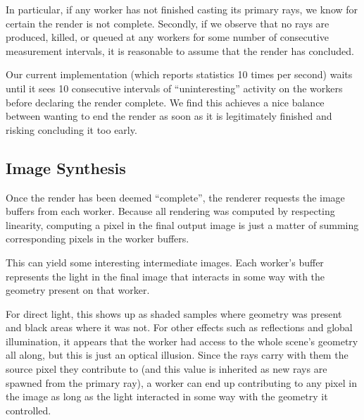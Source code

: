 \documentclass[12pt]{ucthesis}
\begin{document}
In particular, if any worker has not finished casting its primary rays, we
know for certain the render is not complete. Secondly, if we observe that no
rays are produced, killed, or queued at any workers for some number of
consecutive measurement intervals, it is reasonable to assume that the render
has concluded.

Our current implementation (which reports statistics 10 times per second)
waits until it sees 10 consecutive intervals of ``uninteresting'' activity on
the workers before declaring the render complete. We find this achieves a nice
balance between wanting to end the render as soon as it is legitimately
finished and risking concluding it too early.

\subsection{Image Synthesis}
\label{synthesis}

Once the render has been deemed ``complete'', the renderer requests the image
buffers from each worker. Because all rendering was computed by respecting
linearity, computing a pixel in the final output image is just a matter
of summing corresponding pixels in the worker buffers.

This can yield some interesting intermediate images. Each worker's buffer
represents the light in the final image that interacts in some way with the
geometry present on that worker.

For direct light, this shows up as shaded samples where geometry was present
and black areas where it was not. For other effects such as reflections and
global illumination, it appears that the worker had access to the whole scene's
geometry all along, but this is just an optical illusion. Since the rays
carry with them the source pixel they contribute to (and this value is inherited
as new rays are spawned from the primary ray), a worker can end up contributing
to any pixel in the image as long as the light interacted in some way with the
geometry it controlled.
\end{document}
